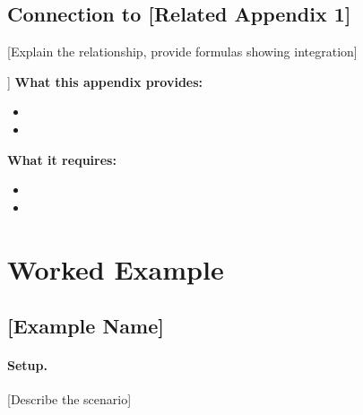 
\subsection{Connection to [Related Appendix 1]}

[Explain the relationship, provide formulas showing integration]

\begin{tcolorbox}[colback=yellow!5!white, colframe=yellow!75!black, 
    title=Integration: This Appendix $\leftrightarrow$ [Related Appendix]]
\textbf{What this appendix provides:}
\begin{itemize}[nosep]
\item [Item 1]
\item [Item 2]
\end{itemize}

\textbf{What it requires:}
\begin{itemize}[nosep]
\item [Item 1]
\item [Item 2]
\end{itemize}
\end{tcolorbox}


%
%

\section{Worked Example}
\label{sec:[code]-example}


\subsection{[Example Name]}

\paragraph{Setup.} [Describe the scenario]

